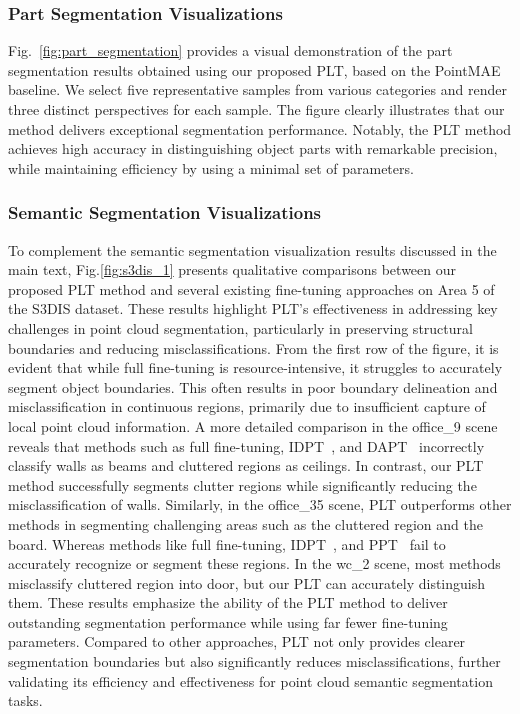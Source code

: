 \subsubsection{Part Segmentation Visualizations}  
Fig.~\ref{fig:part_segmentation} provides a visual demonstration of the part segmentation results obtained using our proposed PLT, based on the PointMAE~\cite{pang2022masked} baseline. We select five representative samples from various categories and render three distinct perspectives for each sample. The figure clearly illustrates that our method delivers exceptional segmentation performance. Notably, the PLT method achieves high accuracy in distinguishing object parts with remarkable precision, while maintaining efficiency by using a minimal set of parameters.

\subsubsection{Semantic Segmentation Visualizations}  
To complement the semantic segmentation visualization results discussed in the main text, Fig.\ref{fig:s3dis_1} presents qualitative comparisons between our proposed PLT method and several existing fine-tuning approaches on Area 5 of the S3DIS dataset\cite{armeni20163d}. These results highlight PLT’s effectiveness in addressing key challenges in point cloud segmentation, particularly in preserving structural boundaries and reducing misclassifications. From the first row of the figure, it is evident that while full fine-tuning is resource-intensive, it struggles to accurately segment object boundaries. This often results in poor boundary delineation and misclassification in continuous regions, primarily due to insufficient capture of local point cloud information. A more detailed comparison in the office\_9 scene reveals that methods such as full fine-tuning, IDPT~\cite{zha2023instance}, and DAPT~\cite{zhou2024dynamic} incorrectly classify walls as beams and cluttered regions as ceilings. In contrast, our PLT method successfully segments clutter regions while significantly reducing the misclassification of walls. Similarly, in the office\_35 scene, PLT outperforms other methods in segmenting challenging areas such as the cluttered region and the board. Whereas methods like full fine-tuning, IDPT~\cite{zha2023instance}, and PPT~\cite{zhang2024positional} fail to accurately recognize or segment these regions. In the wc\_2 scene, most methods misclassify cluttered region into door, but our PLT can accurately distinguish them. These results emphasize the ability of the PLT method to deliver outstanding segmentation performance while using far fewer fine-tuning parameters. Compared to other approaches, PLT not only provides clearer segmentation boundaries but also significantly reduces misclassifications, further validating its efficiency and effectiveness for point cloud semantic segmentation tasks.








